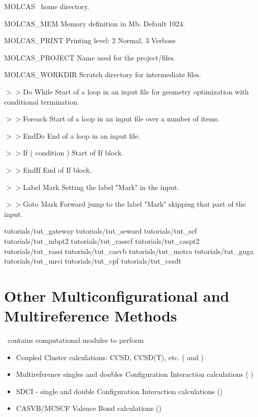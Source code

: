 \begin{variablelist}
\item[MOLCAS] \molcas\ home directory.
\item[MOLCAS\_MEM] Memory definition in Mb. Default 1024.
\item[MOLCAS\_PRINT] Printing level: 2 Normal, 3 Verbose
\item[MOLCAS\_PROJECT] Name used for the project/files.
\item[MOLCAS\_WORKDIR] Scratch directory for intermediate files.
\end{variablelist}
\begin{commandlist}
\item[$>>$Do While] Start of a loop in an input file for geometry optimization with conditional termination.
\item[$>>$Foreach]  Start of a loop in an input file over a number of items.
\item[$>>$EndDo] End of a loop in an input file.
\item[$>>$If ( condition )] Start of If block.
\item[$>>$EndIf] End of If block.
\item[$>>$Label Mark] Setting the label "Mark" in the input.
\item[$>>$Goto Mark] Forward jump to the label "Mark" skipping that part of the input.
\end{commandlist}


 {tutorials/tut_gateway}
 {tutorials/tut_seward}
 {tutorials/tut_scf}
 {tutorials/tut_mbpt2}
 {tutorials/tut_rasscf}
 {tutorials/tut_caspt2}
 {tutorials/tut_rassi}
\ifmanual
 {tutorials/tut_casvb}
 {tutorials/tut_motra}
 {tutorials/tut_guga}
 {tutorials/tut_mrci}
 {tutorials/tut_cpf}
 {tutorials/tut_ccsdt}
\else
\section{Other Multiconfigurational and Multireference Methods}
\molcas\ contains computational modules to perform
\begin{itemize}
\item Coupled Cluster calculations: CCSD, CCSD(T), etc.  ( and )
\item Multireference singles and doubles Configuration Interaction calculations (  )
\item SDCI - single and double Configuration Interaction calculations ()
\item CASVB/MCSCF Valence Bond calculations ()
\end{itemize}

